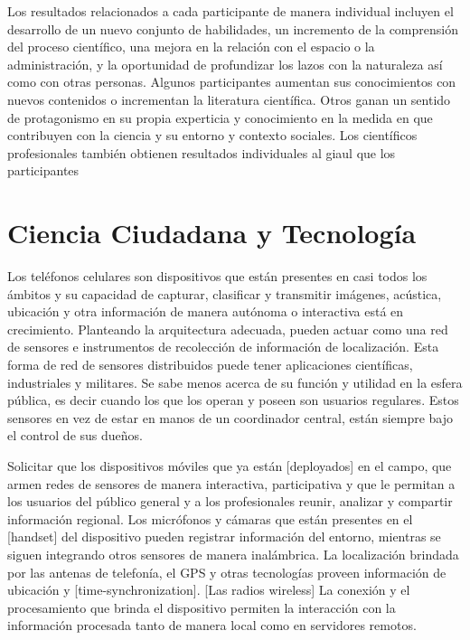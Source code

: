 \begin{itemize}
		Los resultados relacionados a cada participante de manera individual incluyen el desarrollo de un nuevo conjunto de habilidades, un incremento de la comprensión del proceso científico, una mejora en la relación con el espacio o la administración, y la oportunidad de profundizar los lazos con la naturaleza así como con otras personas. Algunos participantes aumentan sus conocimientos con nuevos contenidos o incrementan la literatura científica. Otros ganan un sentido de protagonismo en su propia experticia y conocimiento en la medida en que contribuyen con la ciencia y su entorno y contexto sociales. Los científicos profesionales también obtienen resultados individuales al giaul que los participantes
			
		
\end{itemize}	


\section{Ciencia Ciudadana y Tecnología}

	Los teléfonos celulares son dispositivos que están presentes en casi todos los ámbitos y su capacidad de capturar, clasificar y transmitir imágenes, acústica, ubicación y otra información de manera autónoma o interactiva está en crecimiento.
Planteando la arquitectura adecuada, pueden actuar como una red de sensores e instrumentos de recolección de información de localización. 
Esta forma de red de sensores distribuidos puede tener aplicaciones científicas, industriales y militares. Se sabe menos acerca de su función y utilidad en la esfera pública, es decir cuando los que los operan y poseen son usuarios regulares.   Estos sensores en vez de estar en manos de un coordinador central, están siempre bajo el control de sus dueños.

	Solicitar que los dispositivos móviles que ya están [deployados] en el campo, que armen redes de sensores de manera interactiva, participativa y que le permitan a los usuarios del público general y a los profesionales reunir, analizar y compartir información regional. Los micrófonos y cámaras que están presentes en el [handset] del dispositivo pueden registrar información del entorno, mientras se siguen integrando otros sensores de manera inalámbrica. La localización brindada por las antenas de telefonía, el GPS y otras tecnologías proveen información de ubicación y [time-synchronization]. [Las radios wireless] La conexión y el procesamiento que brinda el dispositivo permiten la interacción con la información procesada tanto de manera local como en servidores remotos. 
	
